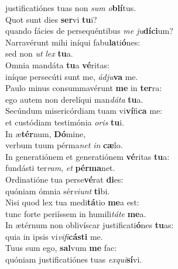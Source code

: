 \oddverse justificatiónes tuas non \textit{sum} \textit{o}\textbf{blí}tus.\\
\evenverse Quot sunt dies \textbf{ser}vi \textbf{tu}i?~\*\\
\evenverse quando fácies de persequéntibus \textit{me} \textit{ju}\textbf{dí}\textbf{ci}um?\\
\oddverse Narravérunt mihi iníqui fabu\textbf{la}ti\textbf{ó}nes:~\*\\
\oddverse sed non \textit{ut} \textit{lex} \textbf{tu}a.\\
\evenverse Omnia mandáta \textbf{tu}a \textbf{vé}ritas:~\*\\
\evenverse iníque persecúti sunt me, \textit{ád}\textit{ju}\textbf{va} me.\\
\oddverse Paulo minus consummavérunt \textbf{me} in \textbf{ter}ra:~\*\\
\oddverse ego autem non derelíqui man\textit{dá}\textit{ta} \textbf{tu}a.\\
\evenverse Secúndum misericórdiam tuam vi\textbf{ví}fi\textbf{ca} me:~\*\\
\evenverse et custódiam testimónia \textit{o}\textit{ris} \textbf{tu}i.\\
\oddverse In æ\textbf{tér}num, \textbf{Dó}mine,~\*\\
\oddverse verbum tuum pérma\textit{net} \textit{in} \textbf{cæ}lo.\\
\evenverse In generatiónem et generatiónem \textbf{vé}ritas \textbf{tu}a:~\*\\
\evenverse fundásti ter\textit{ram}, \textit{et} \textbf{pér}\textbf{ma}net.\\
\oddverse Ordinatióne tua perse\textbf{vé}rat \textbf{di}es:~\*\\
\oddverse quóniam ómnia sér\textit{vi}\textit{unt} \textbf{ti}bi.\\
\evenverse Nisi quod lex tua medi\textbf{tá}tio \textbf{me}a est:~\*\\
\evenverse tunc forte periíssem in humili\textit{tá}\textit{te} \textbf{me}a.\\
\oddverse In ætérnum non oblivíscar justificati\textbf{ó}nes \textbf{tu}as:~\*\\
\oddverse quia in ipsis vi\textit{vi}\textit{fi}\textbf{cá}\textbf{sti} me.\\
\evenverse Tuus sum ego, \textbf{sal}vum \textbf{me} fac:~\*\\
\evenverse quóniam justificatiónes tuas \textit{ex}\textit{qui}\textbf{sí}vi.\\
